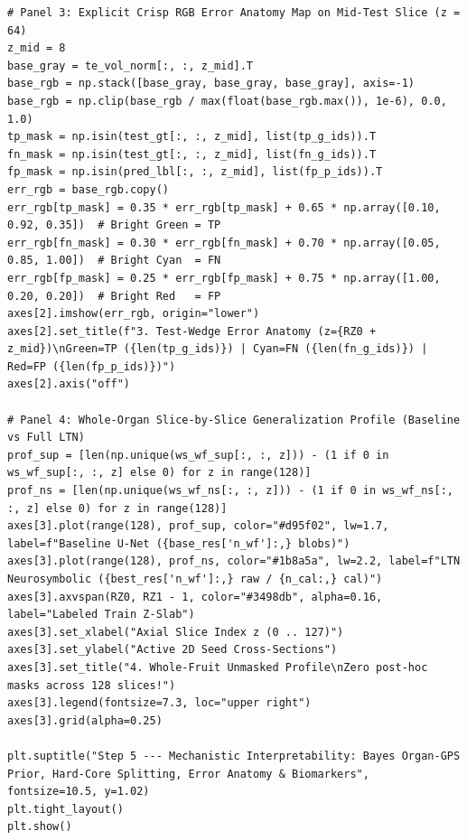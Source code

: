 \documentclass[10pt,a4paper]{article}
\begin{document}
\begin{codebox}
\begin{lstlisting}[style=pybmed]
# Panel 3: Explicit Crisp RGB Error Anatomy Map on Mid-Test Slice (z = 64)
z_mid = 8
base_gray = te_vol_norm[:, :, z_mid].T
base_rgb = np.stack([base_gray, base_gray, base_gray], axis=-1)
base_rgb = np.clip(base_rgb / max(float(base_rgb.max()), 1e-6), 0.0, 1.0)
tp_mask = np.isin(test_gt[:, :, z_mid], list(tp_g_ids)).T
fn_mask = np.isin(test_gt[:, :, z_mid], list(fn_g_ids)).T
fp_mask = np.isin(pred_lbl[:, :, z_mid], list(fp_p_ids)).T
err_rgb = base_rgb.copy()
err_rgb[tp_mask] = 0.35 * err_rgb[tp_mask] + 0.65 * np.array([0.10, 0.92, 0.35])  # Bright Green = TP
err_rgb[fn_mask] = 0.30 * err_rgb[fn_mask] + 0.70 * np.array([0.05, 0.85, 1.00])  # Bright Cyan  = FN
err_rgb[fp_mask] = 0.25 * err_rgb[fp_mask] + 0.75 * np.array([1.00, 0.20, 0.20])  # Bright Red   = FP
axes[2].imshow(err_rgb, origin="lower")
axes[2].set_title(f"3. Test-Wedge Error Anatomy (z={RZ0 + z_mid})\nGreen=TP ({len(tp_g_ids)}) | Cyan=FN ({len(fn_g_ids)}) | Red=FP ({len(fp_p_ids)})")
axes[2].axis("off")

# Panel 4: Whole-Organ Slice-by-Slice Generalization Profile (Baseline vs Full LTN)
prof_sup = [len(np.unique(ws_wf_sup[:, :, z])) - (1 if 0 in ws_wf_sup[:, :, z] else 0) for z in range(128)]
prof_ns = [len(np.unique(ws_wf_ns[:, :, z])) - (1 if 0 in ws_wf_ns[:, :, z] else 0) for z in range(128)]
axes[3].plot(range(128), prof_sup, color="#d95f02", lw=1.7, label=f"Baseline U-Net ({base_res['n_wf']:,} blobs)")
axes[3].plot(range(128), prof_ns, color="#1b8a5a", lw=2.2, label=f"LTN Neurosymbolic ({best_res['n_wf']:,} raw / {n_cal:,} cal)")
axes[3].axvspan(RZ0, RZ1 - 1, color="#3498db", alpha=0.16, label="Labeled Train Z-Slab")
axes[3].set_xlabel("Axial Slice Index z (0 .. 127)")
axes[3].set_ylabel("Active 2D Seed Cross-Sections")
axes[3].set_title("4. Whole-Fruit Unmasked Profile\nZero post-hoc masks across 128 slices!")
axes[3].legend(fontsize=7.3, loc="upper right")
axes[3].grid(alpha=0.25)

plt.suptitle("Step 5 --- Mechanistic Interpretability: Bayes Organ-GPS Prior, Hard-Core Splitting, Error Anatomy & Biomarkers", fontsize=10.5, y=1.02)
plt.tight_layout()
plt.show()
\end{lstlisting}
\end{codebox}
\end{document}
